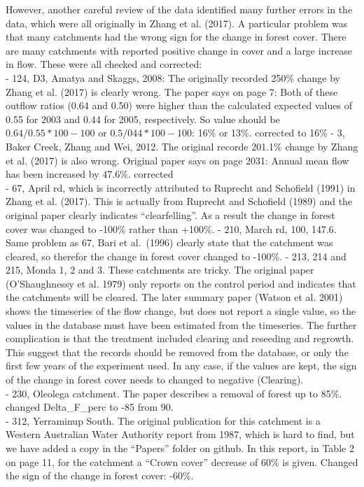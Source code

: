 \documentclass[]{elsarticle} %
\begin{document}
However, another careful review of the data identified many further errors in the data, which were all originally in Zhang et al. (2017). A particular problem was that many catchments had the wrong sign for the change in forest cover. There are many catchments with reported positive change in cover and a large increase in flow. These were all checked and corrected:\\
- 124, D3, Amatya and Skaggs, 2008: The originally recorded 250\% change by Zhang et al. (2017) is clearly wrong. The paper says on page 7: Both of these outflow ratios (0.64 and 0.50) were higher than the calculated expected values of 0.55 for 2003 and 0.44 for 2005, respectively. So value should be \(0.64/0.55*100 - 100\) or \(0.5/044*100 - 100\): 16\% or 13\%. corrected to 16\%
- 3, Baker Creek, Zhang and Wei, 2012. The original recorde 201.1\% change by Zhang et al. (2017) is also wrong. Original paper says on page 2031: Annual mean flow has been increased by 47.6\%. corrected\\
- 67, April rd, which is incorrectly attributed to Ruprecht and Schofield (1991) in Zhang et al. (2017). This is actually from Ruprecht and Schofield (1989) and the original paper clearly indicates ``clearfelling''. As a result the change in forest cover was changed to -100\% rather than +100\%.
- 210, March rd, 100, 147.6. Same problem as 67, Bari et al.~(1996) clearly state that the catchment was cleared, so therefor the change in forest cover changed to -100\%.
- 213, 214 and 215, Monda 1, 2 and 3. These catchments are tricky. The original paper (O'Shaughnessy et al. 1979) only reports on the control period and indicates that the catchments will be cleared. The later summary paper (Watson et al. 2001) shows the timeseries of the flow change, but does not report a single value, so the values in the database must have been estimated from the timeseries. The further complication is that the treatment included clearing and reseeding and regrowth. This suggest that the records should be removed from the database, or only the first few years of the experiment used. In any case, if the values are kept, the sign of the change in forest cover needs to changed to negative (Clearing).\\
- 230, Oleolega catchment. The paper describes a removal of forest up to 85\%. changed Delta\_F\_perc to -85 from 90.\\
- 312, Yerraminup South. The original publication for this catchment is a Western Australian Water Authority report from 1987, which is hard to find, but we have added a copy in the ``Papers'' folder on github. In this report, in Table 2 on page 11, for the catchment a ``Crown cover'' decrease of 60\% is given. Changed the sign of the change in forest cover: -60\%.\\
\end{document}
